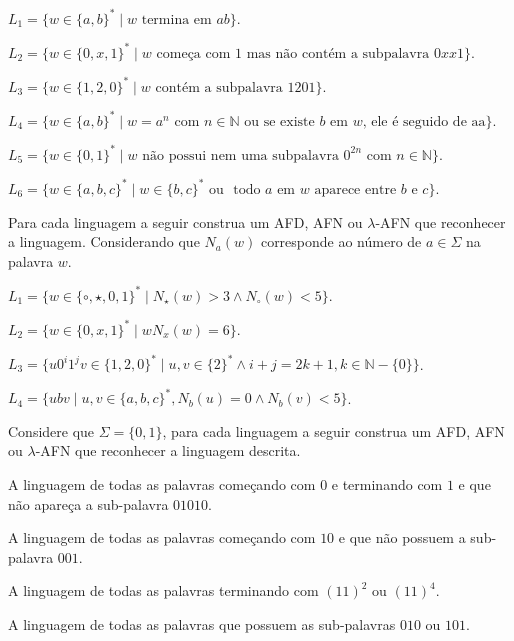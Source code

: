 \begin{exerList}
	\item $L_1 = \{w \in \{a,b\}^* \mid w \text{ termina em } ab\}$.
  \item $L_2 = \{w \in \{0, x, 1\}^* \mid w \text{ começa com } 1 \text{ mas não contém a subpalavra } 0xx1 \}$.
  \item $L_3 = \{w \in \{1, 2, 0\}^* \mid w \text{ contém a subpalavra } 1201\}$.
  \item $L_4 = \{w \in \{a,b\}^* \mid w = a^n \text{ com } n \in \mathbb{N} \text{ ou se existe } b \text{ em } w \text{, ele é seguido de aa}\}$.
  \item $L_5 = \{w \in \{0,1\}^* \mid w \text{ não possui nem uma subpalavra } 0^{2n} \text{ com } n \in \mathbb{N}\}$.
  \item $L_6 = \{w \in \{a,b, c\}^* \mid w \in \{b, c\}^* \text{ ou } \text{ todo } a \text{ em } w \text{ aparece entre } b \text{ e } c\}$.
\end{exerList}

\begin{questao}\label{exer:AF2}
	Para cada linguagem a seguir construa um AFD, AFN ou $\lambda$-AFN que reconhecer a linguagem. Considerando que $N_a(w)$ corresponde ao número de $a \in \Sigma$ na palavra $w$.
\end{questao}

\begin{exerList}
	\item $L_1 = \{w \in \{\circ, \star, 0, 1\}^* \mid N_\star(w) > 3 \land N_\circ(w) < 5\}$.
  \item $L_2 = \{w \in \{0, x, 1\}^* \mid w N_x(w) = 6\}$.
  \item $L_3 = \{u0^i1^jv \in \{1, 2, 0\}^* \mid u, v \in \{2\}^* \land  i + j = 2k + 1, k \in \mathbb{N}-\{0\}\}$.
	\item $L_4 = \{ubv \mid u, v \in \{a, b, c\}^*, N_b(u) = 0 \land N_b(v) < 5\}$.
\end{exerList}

\begin{questao}\label{exer:AF3}
	Considere que $\Sigma = \{0, 1\}$, para cada linguagem a seguir construa um AFD, AFN ou $\lambda$-AFN que reconhecer a linguagem descrita.
\end{questao}

\begin{exerList}
	\item A linguagem de todas as palavras começando com $0$ e terminando com $1$ e que não apareça a sub-palavra $01010$.
	\item A linguagem de todas as palavras começando com $10$ e que não possuem a sub-palavra $001$.
	\item A linguagem de todas as palavras terminando com $(11)^2$ ou $(11)^4$. 
	\item A linguagem de todas as palavras que possuem as sub-palavras $010$ ou $101$.
\end{exerList}


